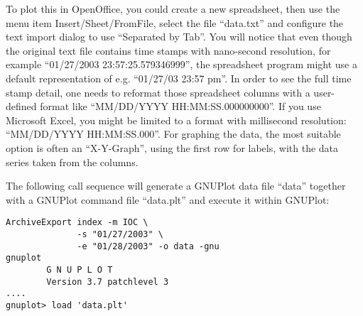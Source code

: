\noindent To plot this in OpenOffice, you could create a new
spreadsheet, then use the menu item Insert/Sheet/FromFile, select the
file ``data.txt'' and configure the text import dialog to use
``Separated by Tab''. You will notice that even though the original
text file contains time stamps with nano-second resolution, for
example ``01/27/2003 23:57:25.579346999'', the spreadsheet program
might use a default representation of e.g. 
``01/27/03 23:57 pm''.
In order to see the full time stamp detail, one needs to reformat
those spreadsheet columns with a user-defined format like
``MM/DD/YYYY HH:MM:SS.000000000''.
If you use Microsoft Excel, you might be limited to a format with
millisecond resolution: ``MM/DD/YYYY HH:MM:SS.000''.
For graphing the data, the most suitable option is often an
``X-Y-Graph'', using the first row for labels, with the data series
taken from the columns.

The following call sequence will generate a GNUPlot data file ``data''
together with a GNUPlot command file ``data.plt'' and execute it
within GNUPlot:
\begin{lstlisting}[frame=none,keywordstyle=\sffamily]
ArchiveExport index -m IOC \
              -s "01/27/2003" \
              -e "01/28/2003" -o data -gnu
gnuplot
        G N U P L O T
        Version 3.7 patchlevel 3
....
gnuplot> load 'data.plt'
\end{lstlisting}
